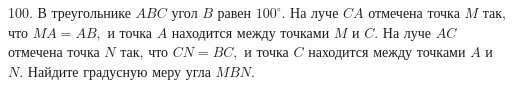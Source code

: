 100. В треугольнике $ABC$ угол $B$ равен $100^\circ.$ На луче $CA$ отмечена точка $M$ так, что $MA=AB,$ и точка $A$ находится между точками $M$ и $C.$ На луче $AC$ отмечена точка $N$ так, что $CN=BC,$ и точка $C$ находится между точками $A$ и $N.$ Найдите градусную меру угла $MBN.$\\
